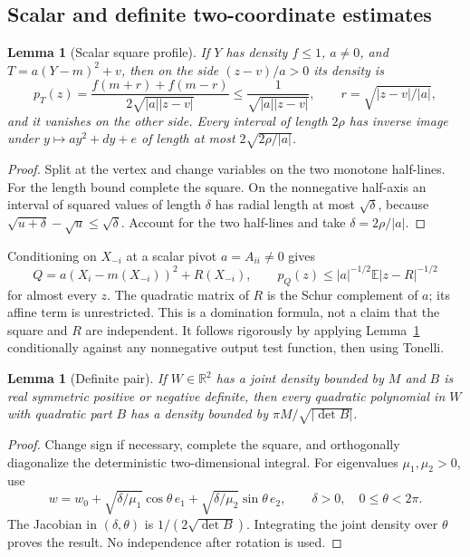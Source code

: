 \documentclass[11pt]{article}
\numberwithin{equation}{section}
\newtheorem{lemma}[theorem]{Lemma}
\theoremstyle{definition}\newtheorem{definition}[theorem]{Definition}
\theoremstyle{remark}\newtheorem{remark}[theorem]{Remark}
\newcommand{\R}{\mathbb R}\newcommand{\E}{\mathbb E}\newcommand{\PP}{\mathbb P}
\newcommand{\1}{\mathbf 1}\newcommand{\diag}{\operatorname{diag}}
\begin{document}
\subsection{Scalar and definite two-coordinate estimates}
\begin{lemma}[Scalar square profile]\label{lem:square}
If $Y$ has density $f\le1$, $a\ne0$, and $T=a(Y-m)^2+v$, then on the side $(z-v)/a>0$ its density is
\[
 p_T(z)=\frac{f(m+r)+f(m-r)}{2\sqrt{|a||z-v|}}
 \le\frac1{\sqrt{|a||z-v|}},\qquad r=\sqrt{|z-v|/|a|},
\]
and it vanishes on the other side. Every interval of length $2\rho$ has inverse image under $y\mapsto ay^2+dy+e$ of length at most $2\sqrt{2\rho/|a|}$.
\end{lemma}
\begin{proof}
Split at the vertex and change variables on the two monotone half-lines. For the length bound complete the square. On the nonnegative half-axis an interval of squared values of length $\delta$ has radial length at most $\sqrt\delta$, because $\sqrt{u+\delta}-\sqrt u\le\sqrt\delta$. Account for the two half-lines and take $\delta=2\rho/|a|$.
\end{proof}

Conditioning on $X_{-i}$ at a scalar pivot $a=A_{ii}\ne0$ gives
\begin{equation}\label{eq:profile}
 Q=a(X_i-m(X_{-i}))^2+R(X_{-i}),\qquad
 p_Q(z)\le |a|^{-1/2}\E|z-R|^{-1/2}
\end{equation}
for almost every $z$. The quadratic matrix of $R$ is the Schur complement of $a$; its affine term is unrestricted. This is a domination formula, not a claim that the square and $R$ are independent. It follows rigorously by applying Lemma~\ref{lem:square} conditionally against any nonnegative output test function, then using Tonelli.

\begin{lemma}[Definite pair]\label{lem:definite}
If $W\in\R^2$ has a joint density bounded by $M$ and $B$ is real symmetric positive or negative definite, then every quadratic polynomial in $W$ with quadratic part $B$ has a density bounded by $\pi M/\sqrt{|\det B|}$.
\end{lemma}
\begin{proof}
Change sign if necessary, complete the square, and orthogonally diagonalize the deterministic two-dimensional integral. For eigenvalues $\mu_1,\mu_2>0$, use
\[
 w=w_0+\sqrt{\delta/\mu_1}\cos\theta\,e_1+
 \sqrt{\delta/\mu_2}\sin\theta\,e_2,
 \qquad \delta>0,\quad0\le\theta<2\pi.
\]
The Jacobian in $(\delta,\theta)$ is $1/(2\sqrt{\det B})$. Integrating the joint density over $\theta$ proves the result. No independence after rotation is used.
\end{proof}
\end{document}
